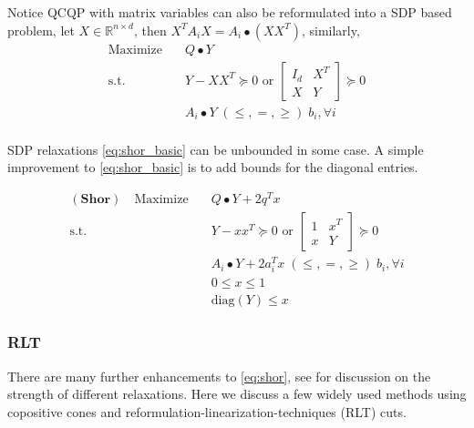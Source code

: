 \documentclass[../main]{subfiles}
\begin{document}
Notice QCQP with matrix variables can also be reformulated into a SDP based problem, let \(X \in \mathbb{R}^{n\times d}\), then \(X^{T} A_{i} X = A_i \bullet (XX^T)\), similarly,
\begin{equation}
  \begin{aligned}
    \mathrm{Maximize}\quad & Q\bullet Y                                                       \\
    \mathrm{s.t.}  \quad   & Y-XX^T \succeq 0 \text { or }\begin{bmatrix} I_d & X^{T} \\ X & Y \end{bmatrix} \succeq 0 \\
                           & A_i \bullet Y \; (\le, =, \ge) \; b_i, \forall i                 \\
  \end{aligned}
\end{equation}

SDP relaxations \eqref{eq:shor_basic} can be unbounded in some case. A simple improvement to \eqref{eq:shor_basic} is to add bounds for the diagonal entries.

\begin{equation}\label{eq:shor}
  \begin{aligned}
    (\mathbf{Shor}) \quad\mathrm{Maximize}\quad & Q\bullet Y   + 2q^T x                                            \\
    \mathrm{s.t.}  \quad                        & Y-xx^T \succeq 0 \text { or }\begin{bmatrix} 1 & x^{T} \\ x & Y \end{bmatrix} \succeq 0 \\
                                                & A_i \bullet Y +2 a_i^Tx \; (\le, =, \ge) \; b_i, \forall i       \\
                                                & 0\le x\le 1                                                      \\
                                                & \mathrm{diag}(Y) \le x
  \end{aligned}
\end{equation}

\subsubsection{RLT}
There are many further enhancements to \eqref{eq:shor}, see \cite{bao_semidefinite_2011} for discussion on the strength of different relaxations. Here we discuss a few widely used methods using copositive cones and reformulation-linearization-techniques (RLT) cuts.
\end{document}
